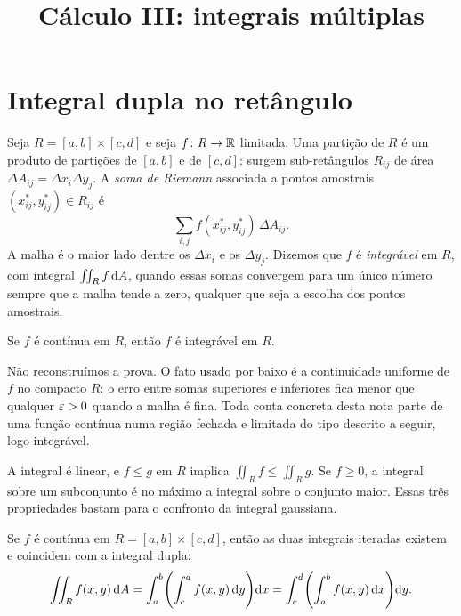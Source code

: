 \documentclass[11pt,a4paper]{article}
\title{Cálculo III: integrais múltiplas}
\author{}
\date{}
\begin{document}
\maketitle
\tableofcontents

\section{Integral dupla no retângulo}


Seja $R=[a,b]\times[c,d]$ e seja $f\colon R\to\mathbb{R}$ limitada. Uma partição de $R$ é um produto de partições de $[a,b]$ e de $[c,d]$: surgem sub-retângulos $R_{ij}$ de área $\Delta A_{ij}=\Delta x_i\Delta y_j$. A \emph{soma de Riemann} associada a pontos amostrais $(x_{ij}^*,y_{ij}^*)\in R_{ij}$ é
\[
\sum_{i,j} f(x_{ij}^*,y_{ij}^*)\,\Delta A_{ij}.
\]
A malha é o maior lado dentre os $\Delta x_i$ e os $\Delta y_j$. Dizemos que $f$ é \emph{integrável} em $R$, com integral $\iint_R f\,\mathrm{d} A$, quando essas somas convergem para um único número sempre que a malha tende a zero, qualquer que seja a escolha dos pontos amostrais.

\begin{teorema}
Se $f$ é contínua em $R$, então $f$ é integrável em $R$.
\end{teorema}

Não reconstruímos a prova. O fato usado por baixo é a continuidade uniforme de $f$ no compacto $R$: o erro entre somas superiores e inferiores fica menor que qualquer $\varepsilon>0$ quando a malha é fina. Toda conta concreta desta nota parte de uma função contínua numa região fechada e limitada do tipo descrito a seguir, logo integrável.

A integral é linear, e $f\le g$ em $R$ implica $\iint_R f\le\iint_R g$. Se $f\ge 0$, a integral sobre um subconjunto é no máximo a integral sobre o conjunto maior. Essas três propriedades bastam para o confronto da integral gaussiana.

\begin{teorema}
Se $f$ é contínua em $R=[a,b]\times[c,d]$, então as duas integrais iteradas existem e coincidem com a integral dupla:
\[
\iint_R f(x,y)\,\mathrm{d} A
=\int_a^b\Biggl(\int_c^d f(x,y)\,\mathrm{d} y\Biggr)\mathrm{d} x
=\int_c^d\Biggl(\int_a^b f(x,y)\,\mathrm{d} x\Biggr)\mathrm{d} y.
\]
\end{teorema}
\end{document}

